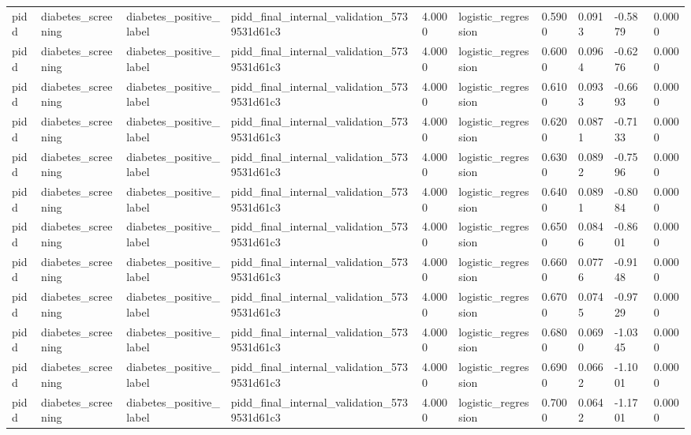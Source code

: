 \begin{tabular}{llllllllll}
pidd & diabetes\_screening & diabetes\_positive\_label & pidd\_final\_internal\_validation\_5739531d61c3 & 4.0000 & logistic\_regression & 0.5900 & 0.0913 & -0.5879 & 0.0000 \\
pidd & diabetes\_screening & diabetes\_positive\_label & pidd\_final\_internal\_validation\_5739531d61c3 & 4.0000 & logistic\_regression & 0.6000 & 0.0964 & -0.6276 & 0.0000 \\
pidd & diabetes\_screening & diabetes\_positive\_label & pidd\_final\_internal\_validation\_5739531d61c3 & 4.0000 & logistic\_regression & 0.6100 & 0.0933 & -0.6693 & 0.0000 \\
pidd & diabetes\_screening & diabetes\_positive\_label & pidd\_final\_internal\_validation\_5739531d61c3 & 4.0000 & logistic\_regression & 0.6200 & 0.0871 & -0.7133 & 0.0000 \\
pidd & diabetes\_screening & diabetes\_positive\_label & pidd\_final\_internal\_validation\_5739531d61c3 & 4.0000 & logistic\_regression & 0.6300 & 0.0892 & -0.7596 & 0.0000 \\
pidd & diabetes\_screening & diabetes\_positive\_label & pidd\_final\_internal\_validation\_5739531d61c3 & 4.0000 & logistic\_regression & 0.6400 & 0.0891 & -0.8084 & 0.0000 \\
pidd & diabetes\_screening & diabetes\_positive\_label & pidd\_final\_internal\_validation\_5739531d61c3 & 4.0000 & logistic\_regression & 0.6500 & 0.0846 & -0.8601 & 0.0000 \\
pidd & diabetes\_screening & diabetes\_positive\_label & pidd\_final\_internal\_validation\_5739531d61c3 & 4.0000 & logistic\_regression & 0.6600 & 0.0776 & -0.9148 & 0.0000 \\
pidd & diabetes\_screening & diabetes\_positive\_label & pidd\_final\_internal\_validation\_5739531d61c3 & 4.0000 & logistic\_regression & 0.6700 & 0.0745 & -0.9729 & 0.0000 \\
pidd & diabetes\_screening & diabetes\_positive\_label & pidd\_final\_internal\_validation\_5739531d61c3 & 4.0000 & logistic\_regression & 0.6800 & 0.0690 & -1.0345 & 0.0000 \\
pidd & diabetes\_screening & diabetes\_positive\_label & pidd\_final\_internal\_validation\_5739531d61c3 & 4.0000 & logistic\_regression & 0.6900 & 0.0662 & -1.1001 & 0.0000 \\
pidd & diabetes\_screening & diabetes\_positive\_label & pidd\_final\_internal\_validation\_5739531d61c3 & 4.0000 & logistic\_regression & 0.7000 & 0.0642 & -1.1701 & 0.0000 \\

\end{tabular}
